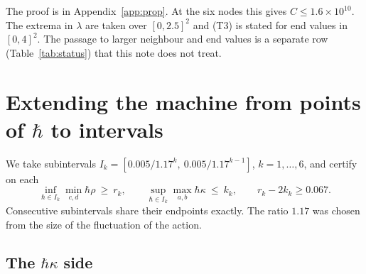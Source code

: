 \documentclass[11pt,a4paper]{article}
\theoremstyle{definition}
\theoremstyle{remark}
\newcommand{\hk}{\hbar\kappa}
\newcommand{\hr}{\hbar\rho}
\begin{document}
The proof is in Appendix~\ref{app:prop}. At the six nodes this gives $C\le1.6\times10^{10}$. The extrema in $\lambda$ are taken over $[0,2.5]^2$ and (T3) is stated for end values in $[0,4]^2$. The passage to larger neighbour and end values is a separate row (Table~\ref{tab:status}) that this note does not treat.

\section{Extending the machine from points of \texorpdfstring{$\hbar$}{hbar} to intervals}\label{sec:scheme}

We take subintervals $I_k=[0.005/1.17^k,\ 0.005/1.17^{k-1}]$, $k=1,\dots,6$, and certify on each
\[
\inf_{\hbar\in I_k}\min_{c,d}\hr\ \ge\ r_k,\qquad \sup_{\hbar\in I_k}\max_{a,b}\hk\ \le\ k_k,\qquad r_k-2k_k\ge0.067 .
\]
Consecutive subintervals share their endpoints exactly. The ratio $1.17$ was chosen from the size of the fluctuation of the action.

\subsection{The \texorpdfstring{$\hk$}{hbar kappa} side}\label{sec:hk}
\end{document}

